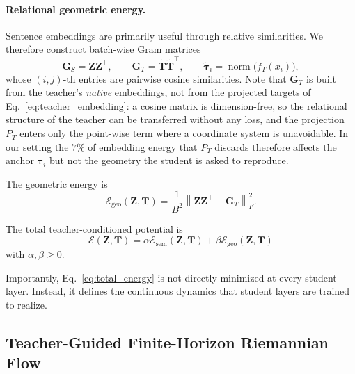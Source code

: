 \documentclass[11pt]{article}
\begin{document}
\paragraph{Relational geometric energy.}

Sentence embeddings are primarily useful through relative similarities.
We therefore construct batch-wise Gram matrices
\begin{equation}
    \mathbf{G}_{S}
    =
    \mathbf{Z}\mathbf{Z}^{\top},
    \qquad
    \mathbf{G}_{T}
    =
    \widetilde{\mathbf{T}}\widetilde{\mathbf{T}}^{\top},
    \qquad
    \widetilde{\boldsymbol{\tau}}_i=\operatorname{norm}\bigl(f_T(x_i)\bigr),
    \label{eq:gram}
\end{equation}
whose $(i,j)$-th entries are pairwise cosine similarities. Note that
$\mathbf{G}_T$ is built from the teacher's \emph{native} embeddings, not
from the projected targets of Eq.~\eqref{eq:teacher_embedding}: a cosine
matrix is dimension-free, so the relational structure of the teacher can be
transferred without any loss, and the projection $P_T$ enters only the
point-wise term where a coordinate system is unavoidable. In our setting the
$7\%$ of embedding energy that $P_T$ discards therefore affects the anchor
$\boldsymbol{\tau}_i$ but not the geometry the student is asked to
reproduce.

The geometric energy is
\begin{equation}
    \mathcal{E}_{\mathrm{geo}}(\mathbf{Z},\mathbf{T})
    =
    \frac{1}{B^2}
    \left\|
        \mathbf{Z}\mathbf{Z}^{\top}
        -
        \mathbf{G}_T
    \right\|_F^2.
    \label{eq:geometry_energy}
\end{equation}

The total teacher-conditioned potential is
\begin{equation}
    \boxed{
    \mathcal{E}(\mathbf{Z},\mathbf{T})
    =
    \alpha
    \mathcal{E}_{\mathrm{sem}}(\mathbf{Z},\mathbf{T})
    +
    \beta
    \mathcal{E}_{\mathrm{geo}}(\mathbf{Z},\mathbf{T})
    }
    \label{eq:total_energy}
\end{equation}
with $\alpha,\beta\ge0$.

Importantly, Eq.~\eqref{eq:total_energy} is not directly minimized at
every student layer. Instead, it defines the continuous dynamics that
student layers are trained to realize.


\subsection{Teacher-Guided Finite-Horizon Riemannian Flow}\label{sec:riemannian_flow}
\end{document}
